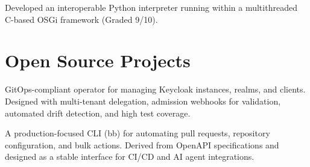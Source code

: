\documentclass[a4paper]{deedy-resume} %
\begin{document}
\begin{minipage}[t]{0.62\textwidth}
\begin{tightitemize}
\item Developed an interoperable Python interpreter running within a multithreaded C-based OSGi framework (Graded 9/10).
\end{tightitemize}
\sectionspace

\section{Open Source Projects}

GitOps-compliant operator for managing Keycloak instances, realms, and clients. Designed with multi-tenant delegation, admission webhooks for validation, automated drift detection, and high test coverage.
\sectionspace

A production-focused CLI (bb) for automating pull requests, repository configuration, and bulk actions. Derived from OpenAPI specifications and designed as a stable interface for CI/CD and AI agent integrations.

\end{minipage} %

\newpage

\begingroup
{}
\renewcommand{\familydefault}{\sfdefault}
\selectfont

\newcommand{\atssection}[1]{
  \vspace{16pt}
  {\fontsize{13pt}{17pt}\selectfont\textbf{\uppercase{#1}}}
  \vspace{4pt}
  \hrule
  \vspace{8pt}
}
\end{document}
